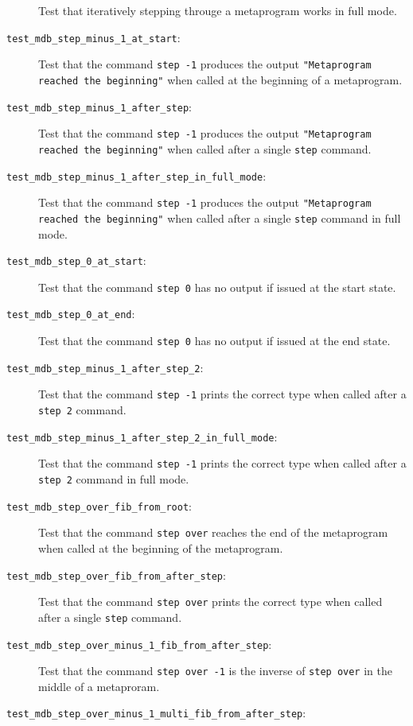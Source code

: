\begin{description}
        Test that iteratively stepping througe a metaprogram works in full
        mode.
    \item[\texttt{test\_mdb\_step\_minus\_1\_at\_start}:]
        Test that the command \texttt{step -1} produces the output
        \texttt{"Metaprogram reached the beginning"} when called at the
        beginning of a metaprogram.
    \item[\texttt{test\_mdb\_step\_minus\_1\_after\_step}:]
        Test that the command \texttt{step -1} produces the output
        \texttt{"Metaprogram reached the beginning"} when called after a single
        \texttt{step} command.
    \item[\texttt{test\_mdb\_step\_minus\_1\_after\_step\_in\_full\_mode}:]
        Test that the command \texttt{step -1} produces the output
        \texttt{"Metaprogram reached the beginning"} when called after a single
        \texttt{step} command in full mode.
    \item[\texttt{test\_mdb\_step\_0\_at\_start}:]
        Test that the command \texttt{step 0} has no output if issued at the
        start state.
    \item[\texttt{test\_mdb\_step\_0\_at\_end}:]
        Test that the command \texttt{step 0} has no output if issued at the
        end state.
    \item[\texttt{test\_mdb\_step\_minus\_1\_after\_step\_2}:]
        Test that the command \texttt{step -1} prints the correct type when
        called after a \texttt{step 2} command.
    \item[\texttt{test\_mdb\_step\_minus\_1\_after\_step\_2\_in\_full\_mode}:]
        Test that the command \texttt{step -1} prints the correct type when
        called after a \texttt{step 2} command in full mode.
    \item[\texttt{test\_mdb\_step\_over\_fib\_from\_root}:]
        Test that the command \texttt{step over} reaches the end of the
        metaprogram when called at the beginning of the metaprogram.
    \item[\texttt{test\_mdb\_step\_over\_fib\_from\_after\_step}:]
        Test that the command \texttt{step over} prints the correct type when
        called after a single \texttt{step} command.
    \item[\texttt{test\_mdb\_step\_over\_minus\_1\_fib\_from\_after\_step}:]
        Test that the command \texttt{step over -1} is the inverse of
        \texttt{step over} in the middle of a metaproram.
    \item[\texttt{test\_mdb\_step\_over\_minus\_1\_multi\_fib\_from\_after\_step}:]

\end{description}
